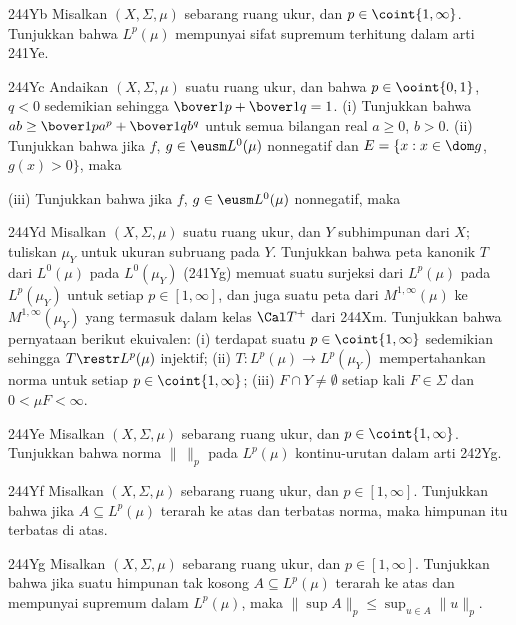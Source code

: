 {\spheader 244Yb Misalkan $(X,\Sigma,\mu)$ sebarang ruang ukur, dan
$p\in\coint{1,\infty}$. Tunjukkan bahwa $L^p(\mu)$ mempunyai sifat
supremum terhitung dalam arti 241Ye. 

\spheader 244Yc Andaikan $(X,\Sigma,\mu)$ suatu ruang ukur,
dan bahwa $p\in\ooint{0,1}$, $q<0$ sedemikian sehingga
$\bover1p+\bover1q=1$. (i) Tunjukkan bahwa
$ab\ge\bover1pa^p+\bover1qb^q$ untuk semua bilangan real $a\ge 0$,
$b>0$. 
(ii) Tunjukkan bahwa jika $f$, $g\in\eusm L^0(\mu)$ nonnegatif dan
$E=\{x:x\in\dom g$, $g(x)>0\}$, maka


\noindent(iii) Tunjukkan bahwa jika $f$, $g\in\eusm L^0(\mu)$
nonnegatif, maka


\spheader 244Yd
Misalkan $(X,\Sigma,\mu)$ suatu ruang ukur, dan $Y$ subhimpunan dari $X$;
tuliskan $\mu_Y$ untuk ukuran subruang pada $Y$. Tunjukkan bahwa peta
kanonik $T$ dari $L^0(\mu)$ pada $L^0(\mu_Y)$ (241Yg) memuat suatu
surjeksi dari $L^p(\mu)$ pada $L^p(\mu_Y)$ untuk setiap
$p\in[1,\infty]$, dan juga suatu peta dari $M^{1,\infty}(\mu)$ ke
$M^{1,\infty}(\mu_Y)$ yang termasuk dalam kelas $\Cal T^+$ dari 244Xm.
Tunjukkan bahwa pernyataan berikut ekuivalen: (i) terdapat suatu
$p\in\coint{1,\infty}$ sedemikian sehingga $T\restr L^p(\mu)$ injektif;
(ii) $T:L^p(\mu)\to L^p(\mu_Y)$ mempertahankan norma untuk setiap
$p\in\coint{1,\infty}$; (iii) $F\cap Y\ne\emptyset$ setiap kali
$F\in\Sigma$ dan $0<\mu F<\infty$.

\spheader 244Ye
Misalkan $(X,\Sigma,\mu)$ sebarang ruang ukur, dan
$p\in\coint{1,\infty}$. Tunjukkan bahwa norma $\|\,\|_p$ pada
$L^p(\mu)$ kontinu-urutan dalam arti 242Yg.

\spheader 244Yf
Misalkan $(X,\Sigma,\mu)$ sebarang ruang ukur, dan $p\in[1,\infty]$.
Tunjukkan bahwa jika $A\subseteq L^p(\mu)$ terarah ke atas dan terbatas
norma, maka himpunan itu terbatas di atas. 

\spheader 244Yg
Misalkan $(X,\Sigma,\mu)$ sebarang ruang ukur, dan $p\in[1,\infty]$.
Tunjukkan bahwa jika suatu himpunan tak kosong $A\subseteq L^p(\mu)$
terarah ke atas dan mempunyai supremum dalam $L^p(\mu)$, maka
$\|\sup A\|_p\le\sup_{u\in A}\|u\|_p$. 

}
